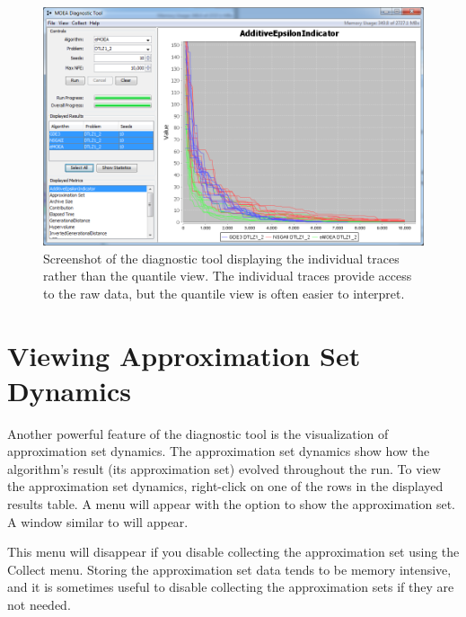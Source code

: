 \begin{figure}
  \includegraphics[width=\linewidth]{diagnosticToolTraces.png}
  \caption{Screenshot of the diagnostic tool displaying the individual traces rather than the quantile view.  The individual traces provide access to the raw data, but the quantile view is often easier to interpret.}
  \label{fig:diagnosticToolTraces}
\end{figure}

\section{Viewing Approximation Set Dynamics}
Another powerful feature of the diagnostic tool is the visualization of approximation set dynamics.  The approximation set dynamics show how the algorithm's result (its approximation set) evolved throughout the run.  To view the approximation set dynamics, right-click on one of the rows in the displayed results table.  A menu will appear with the option to show the approximation set.  A window similar to  will appear.

\begin{important}
  This menu will disappear if you disable collecting the approximation set using the Collect menu.  Storing the approximation set data tends to be memory intensive, and it is sometimes useful to disable collecting the approximation sets if they are not needed.
\end{important}

